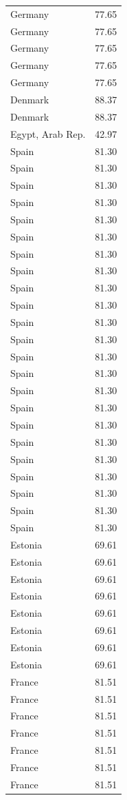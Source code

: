 \documentclass[
]{article}
\begin{document}
\begin{center}
\begin{ThreePartTable}
\begin{longtable}{lc}
Germany & 77.65\\
Germany & 77.65\\
Germany & 77.65\\
Germany & 77.65\\
Germany & 77.65\\
Denmark & 88.37\\
Denmark & 88.37\\
Egypt, Arab Rep. & 42.97\\
Spain & 81.30\\
Spain & 81.30\\
Spain & 81.30\\
Spain & 81.30\\
Spain & 81.30\\
Spain & 81.30\\
Spain & 81.30\\
Spain & 81.30\\
Spain & 81.30\\
Spain & 81.30\\
Spain & 81.30\\
Spain & 81.30\\
Spain & 81.30\\
Spain & 81.30\\
Spain & 81.30\\
Spain & 81.30\\
Spain & 81.30\\
Spain & 81.30\\
Spain & 81.30\\
Spain & 81.30\\
Spain & 81.30\\
Spain & 81.30\\
Spain & 81.30\\
Estonia & 69.61\\
Estonia & 69.61\\
Estonia & 69.61\\
Estonia & 69.61\\
Estonia & 69.61\\
Estonia & 69.61\\
Estonia & 69.61\\
Estonia & 69.61\\
France & 81.51\\
France & 81.51\\
France & 81.51\\
France & 81.51\\
France & 81.51\\
France & 81.51\\
France & 81.51\\

\end{longtable}
\end{ThreePartTable}
\end{center}
\end{document}

